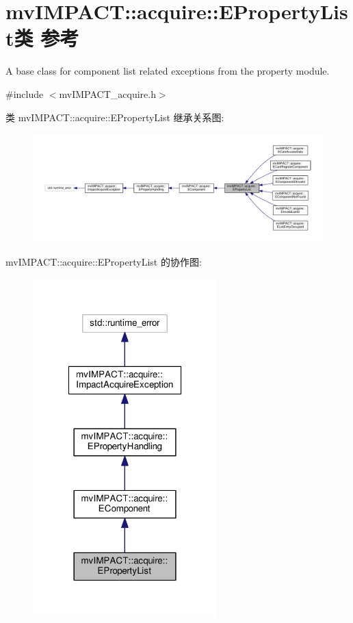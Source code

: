 \hypertarget{classmv_i_m_p_a_c_t_1_1acquire_1_1_e_property_list}{\section{mv\+I\+M\+P\+A\+C\+T\+:\+:acquire\+:\+:E\+Property\+List类 参考}
\label{classmv_i_m_p_a_c_t_1_1acquire_1_1_e_property_list}
}


A base class for component list related exceptions from the property module.  




{\ttfamily \#include $<$mv\+I\+M\+P\+A\+C\+T\+\_\+acquire.\+h$>$}



类 mv\+I\+M\+P\+A\+C\+T\+:\+:acquire\+:\+:E\+Property\+List 继承关系图\+:
\nopagebreak
\begin{figure}[H]
\begin{center}
\leavevmode
\includegraphics[width=350pt]{classmv_i_m_p_a_c_t_1_1acquire_1_1_e_property_list__inherit__graph}
\end{center}
\end{figure}


mv\+I\+M\+P\+A\+C\+T\+:\+:acquire\+:\+:E\+Property\+List 的协作图\+:
\nopagebreak
\begin{figure}[H]
\begin{center}
\leavevmode
\includegraphics[width=202pt]{classmv_i_m_p_a_c_t_1_1acquire_1_1_e_property_list__coll__graph}
\end{center}
\end{figure}
